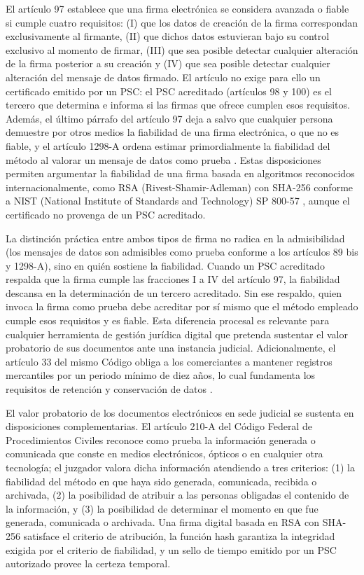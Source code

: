 El artículo 97 establece que una firma electrónica se considera avanzada o fiable si cumple cuatro requisitos: (I) que los datos de creación de la firma correspondan exclusivamente al firmante, (II) que dichos datos estuvieran bajo su control exclusivo al momento de firmar, (III) que sea posible detectar cualquier alteración de la firma posterior a su creación y (IV) que sea posible detectar cualquier alteración del mensaje de datos firmado. El artículo no exige para ello un certificado emitido por un PSC: el PSC acreditado (artículos 98 y 100) es el tercero que determina e informa si las firmas que ofrece cumplen esos requisitos. Además, el último párrafo del artículo 97 deja a salvo que cualquier persona demuestre por otros medios la fiabilidad de una firma electrónica, o que no es fiable, y el artículo 1298-A ordena estimar primordialmente la fiabilidad del método al valorar un mensaje de datos como prueba \cite{ccom2018}. Estas disposiciones permiten argumentar la fiabilidad de una firma basada en algoritmos reconocidos internacionalmente, como RSA (Rivest-Shamir-Adleman) con SHA-256 conforme a NIST (National Institute of Standards and Technology) SP 800-57 \cite{barker2020}, aunque el certificado no provenga de un PSC acreditado.

La distinción práctica entre ambos tipos de firma no radica en la admisibilidad (los mensajes de datos son admisibles como prueba conforme a los artículos 89 bis y 1298-A), sino en quién sostiene la fiabilidad. Cuando un PSC acreditado respalda que la firma cumple las fracciones I a IV del artículo 97, la fiabilidad descansa en la determinación de un tercero acreditado. Sin ese respaldo, quien invoca la firma como prueba debe acreditar por sí mismo que el método empleado cumple esos requisitos y es fiable. Esta diferencia procesal es relevante para cualquier herramienta de gestión jurídica digital que pretenda sustentar el valor probatorio de sus documentos ante una instancia judicial. Adicionalmente, el artículo 33 del mismo Código obliga a los comerciantes a mantener registros mercantiles por un periodo mínimo de diez años, lo cual fundamenta los requisitos de retención y conservación de datos \cite{ccom2018}.

El valor probatorio de los documentos electrónicos en sede judicial se sustenta en disposiciones complementarias. El artículo 210-A del Código Federal de Procedimientos Civiles \cite{cfpc2023} reconoce como prueba la información generada o comunicada que conste en medios electrónicos, ópticos o en cualquier otra tecnología; el juzgador valora dicha información atendiendo a tres criterios: (1) la fiabilidad del método en que haya sido generada, comunicada, recibida o archivada, (2) la posibilidad de atribuir a las personas obligadas el contenido de la información, y (3) la posibilidad de determinar el momento en que fue generada, comunicada o archivada. Una firma digital basada en RSA con SHA-256 satisface el criterio de atribución, la función hash garantiza la integridad exigida por el criterio de fiabilidad, y un sello de tiempo emitido por un PSC autorizado provee la certeza temporal.

